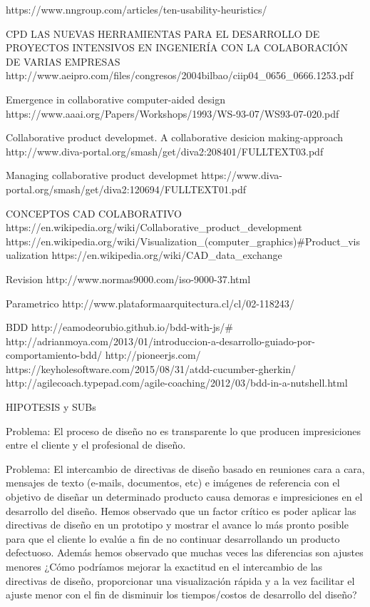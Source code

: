 https://www.nngroup.com/articles/ten-usability-heuristics/





CPD
LAS NUEVAS HERRAMIENTAS PARA EL DESARROLLO DE PROYECTOS INTENSIVOS EN INGENIERÍA CON LA COLABORACIÓN DE VARIAS EMPRESAS
http://www.aeipro.com/files/congresos/2004bilbao/ciip04_0656_0666.1253.pdf

Emergence in collaborative computer-aided design
https://www.aaai.org/Papers/Workshops/1993/WS-93-07/WS93-07-020.pdf

Collaborative product developmet. A collaborative desicion making-approach
http://www.diva-portal.org/smash/get/diva2:208401/FULLTEXT03.pdf

Managing collaborative product developmet
https://www.diva-portal.org/smash/get/diva2:120694/FULLTEXT01.pdf

CONCEPTOS CAD COLABORATIVO
https://en.wikipedia.org/wiki/Collaborative_product_development
https://en.wikipedia.org/wiki/Visualization_(computer_graphics)#Product_visualization
https://en.wikipedia.org/wiki/CAD_data_exchange

Revision
http://www.normas9000.com/iso-9000-37.html

Parametrico
http://www.plataformaarquitectura.cl/cl/02-118243/%


BDD
http://eamodeorubio.github.io/bdd-with-js/#
http://adrianmoya.com/2013/01/introduccion-a-desarrollo-guiado-por-comportamiento-bdd/
http://pioneerjs.com/
https://keyholesoftware.com/2015/08/31/atdd-cucumber-gherkin/
http://agilecoach.typepad.com/agile-coaching/2012/03/bdd-in-a-nutshell.html



HIPOTESIS y SUBs


Problema: El proceso de diseño no es transparente lo que producen impresiciones entre el cliente y el profesional de diseño.


Problema: 
El intercambio de directivas de diseño basado en reuniones cara a cara, mensajes de texto (e-mails, documentos, etc) 
e imágenes de referencia con el objetivo de diseñar un determinado producto causa demoras e impresiciones
en el desarrollo del diseño.
Hemos observado que un factor crítico es poder aplicar las directivas de diseño en un prototipo y mostrar el avance lo 
más pronto posible para que el cliente lo evalúe a fin de no continuar desarrollando un producto defectuoso. Además 
hemos observado que muchas veces las diferencias son ajustes menores ¿Cómo podríamos mejorar la exactitud en el intercambio 
de las directivas de diseño, proporcionar una visualización rápida y a la vez facilitar el ajuste menor con el
fin de disminuir los tiempos/costos de desarrollo del diseño?


